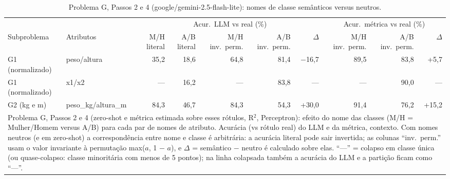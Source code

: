 \begin{table}[htbp]
\centering
\footnotesize
\caption{Problema G, Passos 2 e 4 (google/gemini-2.5-flash-lite): nomes de classe semânticos versus neutros.}
\label{tab:bloco3_G_nomes_semanticos_vs_neutros_flashlite}
\begin{tabular}{llrrrrrrrr}
\toprule
 &  & \multicolumn{5}{c}{Acur.\ LLM vs real (\%)} & \multicolumn{3}{c}{Acur.\ métrica vs real (\%)} \\ \cmidrule(lr){3-7} \cmidrule(lr){8-10}
Subproblema & Atributos & M/H literal & A/B literal & M/H inv.\ perm. & A/B inv.\ perm. & $\Delta$ & M/H inv.\ perm. & A/B inv.\ perm. & $\Delta$ \\
\midrule
G1 (normalizado) & peso/altura & 35,2 & 18,6 & 64,8 & 81,4 & $-$16,7 & 89,5 & 83,8 & +5,7 \\
G1 (normalizado) & x1/x2 & — & 16,2 & — & 83,8 & — & — & 90,0 & — \\
\midrule
G2 (kg e m) & peso\_kg/altura\_m & 84,3 & 46,7 & 84,3 & 54,3 & +30,0 & 91,4 & 76,2 & +15,2 \\
\bottomrule
\multicolumn{10}{p{0.95\linewidth}}{\footnotesize Problema G, Passos 2 e 4 (zero-shot e métrica estimada sobre esses rótulos, R$^2$, Perceptron): efeito do nome das classes (M/H = Mulher/Homem versus A/B) para cada par de nomes de atributo. Acurácia (vs rótulo real) do LLM e da métrica, contexto. Com nomes neutros (e em zero-shot) a correspondência entre nome e classe é arbitrária: a acurácia literal pode sair invertida; as colunas ``inv.\ perm.'' usam o valor invariante à permutação max($a$, 1 $-$ $a$), e $\Delta$ = semântico $-$ neutro é calculado sobre elas. ``—'' = colapso em classe única (ou quase-colapso: classe minoritária com menos de 5 pontos); na linha colapsada também a acurácia do LLM e a partição ficam como ``—''.} \\
\end{tabular}
\end{table}
